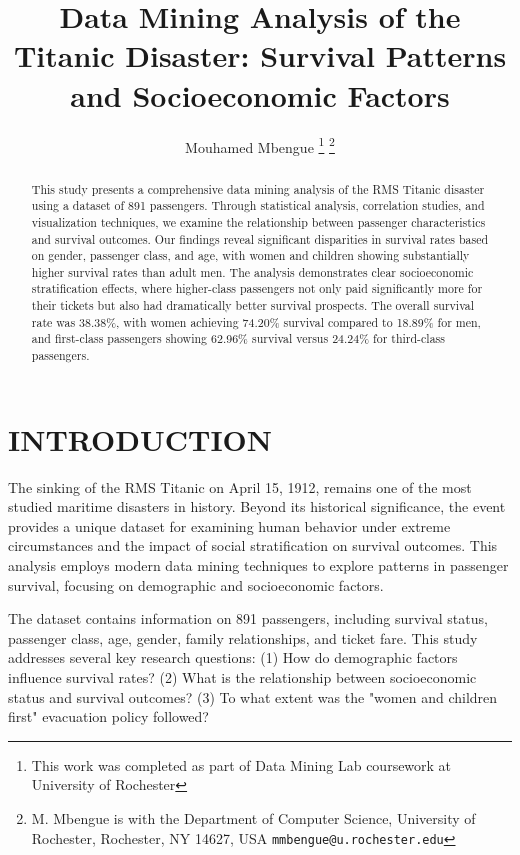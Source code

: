 \documentclass[letterpaper, 10 pt, conference]{ieeeconf}  %
\title{\LARGE \bf
Data Mining Analysis of the Titanic Disaster: Survival Patterns and Socioeconomic Factors
}
\author{Mouhamed Mbengue%
\thanks{This work was completed as part of Data Mining Lab coursework at University of Rochester}%
\thanks{M. Mbengue is with the Department of Computer Science, University of Rochester,
        Rochester, NY 14627, USA
        {\tt\small mmbengue@u.rochester.edu}}%
}
\begin{document}
\maketitle
\thispagestyle{empty}
\pagestyle{empty}


\begin{abstract}

This study presents a comprehensive data mining analysis of the RMS Titanic disaster using a dataset of 891 passengers. Through statistical analysis, correlation studies, and visualization techniques, we examine the relationship between passenger characteristics and survival outcomes. Our findings reveal significant disparities in survival rates based on gender, passenger class, and age, with women and children showing substantially higher survival rates than adult men. The analysis demonstrates clear socioeconomic stratification effects, where higher-class passengers not only paid significantly more for their tickets but also had dramatically better survival prospects. The overall survival rate was 38.38\%, with women achieving 74.20\% survival compared to 18.89\% for men, and first-class passengers showing 62.96\% survival versus 24.24\% for third-class passengers.

\end{abstract}


\section{INTRODUCTION}

The sinking of the RMS Titanic on April 15, 1912, remains one of the most studied maritime disasters in history. Beyond its historical significance, the event provides a unique dataset for examining human behavior under extreme circumstances and the impact of social stratification on survival outcomes. This analysis employs modern data mining techniques to explore patterns in passenger survival, focusing on demographic and socioeconomic factors.

The dataset contains information on 891 passengers, including survival status, passenger class, age, gender, family relationships, and ticket fare. This study addresses several key research questions: (1) How do demographic factors influence survival rates? (2) What is the relationship between socioeconomic status and survival outcomes? (3) To what extent was the "women and children first" evacuation policy followed?
\end{document}
